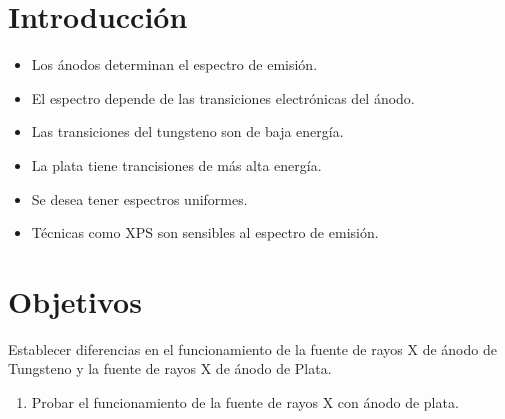 \documentclass{sciposter}
\begin{document}
\begin{multicols}{3}
\section{Introducción}
\begin{itemize}
	\item Los ánodos determinan el espectro de emisión.
	\item El espectro depende de las transiciones electrónicas del ánodo.
	\item Las transiciones del tungsteno son de baja energía.
	\item La plata tiene trancisiones de más alta energía.
	\item Se desea tener espectros uniformes.
	\item Técnicas como XPS son sensibles al espectro de emisión.
\end{itemize}
%	
%	

\section{Objetivos}
	Establecer diferencias en el funcionamiento de la fuente de rayos X de ánodo de Tungsteno y la fuente de rayos X de ánodo de Plata.
	\begin{enumerate}
		\item Probar el funcionamiento de la fuente de rayos X con ánodo de plata.
		

\end{enumerate}
\end{multicols}
\end{document}
